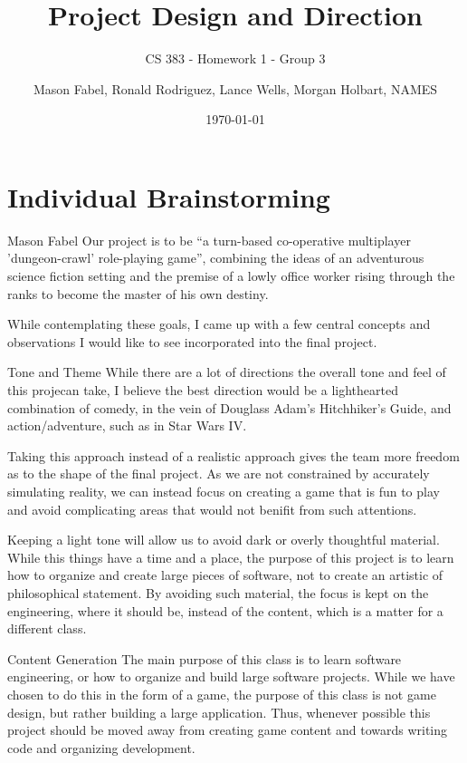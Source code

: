 \documentclass[12pt]{report}
\title{Project Design and Direction}
\subtitle{CS 383 - Homework 1 - Group 3}
\author{Mason Fabel, Ronald Rodriguez, Lance Wells, Morgan Holbart, NAMES} %
\date{\today}
\begin{document}
\maketitle

\chapter{Individual Brainstorming}


\begin{section}{Mason Fabel}
Our project is to be ``a turn-based co-operative multiplayer
'dungeon-crawl' role-playing game'', combining the ideas of an adventurous
science fiction setting and the premise of a lowly office worker rising
through the ranks to become the master of his own destiny.

While contemplating these goals, I came up with a few central concepts and
observations I would like to see incorporated into the final project.

\begin{subsection}{Tone and Theme}
While there are a lot of directions the overall tone and feel of this projecan take, I believe the best direction would be a lighthearted combination of comedy, in the vein of Douglass Adam's Hitchhiker's Guide, and
action/adventure, such as in Star Wars IV.

Taking this approach instead of a realistic approach gives the team more
freedom as to the shape of the final project. As we are not constrained by
accurately simulating reality, we can instead focus on creating a game that
is fun to play and avoid complicating areas that would not benifit from
such attentions.

Keeping a light tone will allow us to avoid dark or overly thoughtful
material. While this things have a time and a place, the purpose
of this project is to learn how to organize and create large pieces of
software, not to create an artistic of philosophical statement. By avoiding
such material, the focus is kept on the engineering, where it should be,
instead of the content, which is a matter for a different class.
\end{subsection}

\begin{subsection}{Content Generation}
The main purpose of this class is to learn software engineering, or how
to organize and build large software projects. While we have chosen to do
this in the form of a game, the purpose of this class is not game design,
but rather building a large application. Thus, whenever possible this
project should be moved away from creating game content and towards writing
code and organizing development.


\end{subsection}
\end{section}
\end{document}
